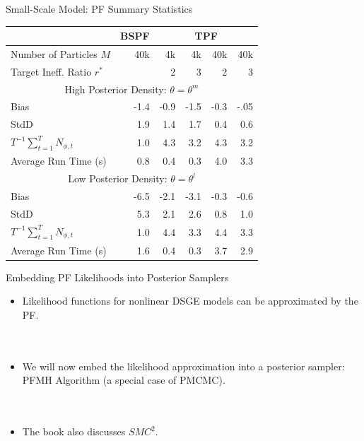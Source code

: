 \documentclass[presentation]{beamer}
\begin{document}
\begin{frame}[label={sec:org1ac0a48}]{Small-Scale Model: PF Summary Statistics}
\begin{center}
	\begin{tabular}{l@{\hspace{1cm}}r@{\hspace{1cm}}rrrr}												    \\ \hline \hline
		& BSPF	 & \multicolumn{4}{c}{TPF} \\ \hline
		Number of Particles $M$		 & 40k & 4k	    & 4k	  & 40k		& 40k	       \\
		Target Ineff. Ratio $r^*$	     &	   & 2		  & 3		   & 2		    & 3		   \\ \hline
		\multicolumn{6}{c}{High Posterior Density: $\theta = \theta^m$}						      \\ \hline
		Bias		& -1.4 & -0.9 & -1.5 & -0.3 & -.05     \\
		StdD		& 1.9  & 1.4  & 1.7  & 0.4  & 0.6	\\
		$T^{-1}\sum_{t=1}^{T}N_{\phi,t}$      & 1.0  & 4.3  & 3.2  & 4.3 & 3.2			  \\
		Average Run Time (s)		 & 0.8	& 0.4 & 0.3 & 4.0 & 3.3	     \\ \hline
		\multicolumn{6}{c}{Low Posterior Density: $\theta = \theta^l$}						      \\ \hline
		Bias		 & -6.5 & -2.1 & -3.1 & -0.3  & -0.6		      \\
		StdD		 & 5.3	& 2.1  & 2.6  & 0.8   & 1.0		       \\
		$T^{-1}\sum_{t=1}^{T}N_{\phi,t}$       & 1.0  & 4.4 & 3.3     & 4.4 & 3.3	       \\
		Average Run Time (s)		 & 1.6 & 0.4 & 0.3 & 3.7     & 2.9		      \\ \hline
	\end{tabular}
\end{center}
\end{frame}



\begin{frame}[label={sec:orga41a2c8}]{Embedding PF Likelihoods into Posterior Samplers}
\begin{itemize}
\item Likelihood functions for nonlinear DSGE models can be approximated by the PF.
\\~\\~
\item We will now embed the likelihood approximation into a posterior sampler:
PFMH Algorithm (a special case of PMCMC).
\\~\\~
\item The book also discusses \(SMC^2\).
\end{itemize}
\end{frame}
\end{document}
